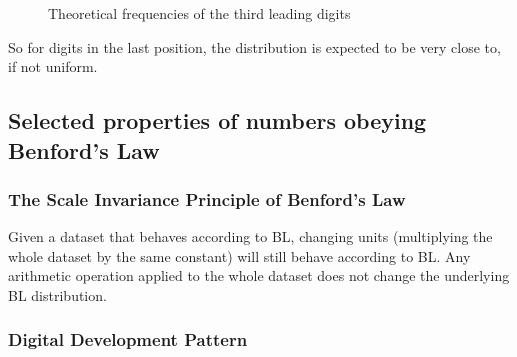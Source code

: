 \begin{figure}[ht]
    \centering
    \caption{Theoretical frequencies of the third leading digits}  
    \label{fig:third-digit-law}
    \pgfplotsset{width=8.5cm,compat=1.18}
\end{figure}

So for digits in the last position, the distribution is expected to be very close to, if not uniform. 

\subsection{Selected properties of numbers obeying Benford's Law}

\subsubsection{The Scale Invariance Principle of Benford's Law}

Given a dataset that behaves according to BL, changing units (multiplying the whole dataset by the same constant) will still behave according to BL. Any arithmetic operation applied to the whole dataset does not change the underlying BL distribution. \cite{kossovsky2014benford, Hronova2023} %

\subsubsection{Digital Development Pattern}

